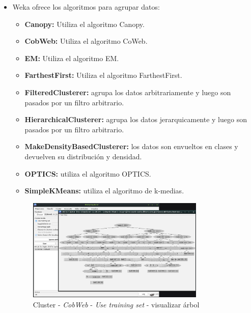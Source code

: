 \documentclass[12pt]{article}
\begin{document}
\begin{itemize}
                    \item Weka ofrece los algoritmos para agrupar datos:
                        \begin{itemize}
                            \item \textbf{Canopy:} Utiliza el algoritmo Canopy.
                            \item \textbf{CobWeb:} Utiliza el algoritmo CoWeb.
                            \item \textbf{EM:} Utiliza el algoritmo EM.
                            \item \textbf{FarthestFirst:} Utiliza el algoritmo FarthestFirst.
                            \item \textbf{FilteredClusterer:} agrupa los datos arbitrariamente y luego son pasados por un filtro arbitrario.
                            \item \textbf{HierarchicalClusterer:} agrupa los datos jerarquicamente y luego son pasados por un filtro arbitrario.
                            \item \textbf{MakeDensityBasedClusterer:}  los datos son envueltos en clases y devuelven su distribución y densidad.
                            \item \textbf{OPTICS:} utiliza el algoritmo OPTICS.
                            \item \textbf{SimpleKMeans:} utiliza el algoritmo de k-medias.
                        \end{itemize}

                        \newpage
                        \begin{figure}[!h]
                            \centering
                            \includegraphics[width=0.8\textwidth]{img/weka-13.png}
                            \caption{Cluster - \textit{CobWeb} - \textit{Use training set} - visualizar árbol}
                        \end{figure}


\end{itemize}
\end{document}
